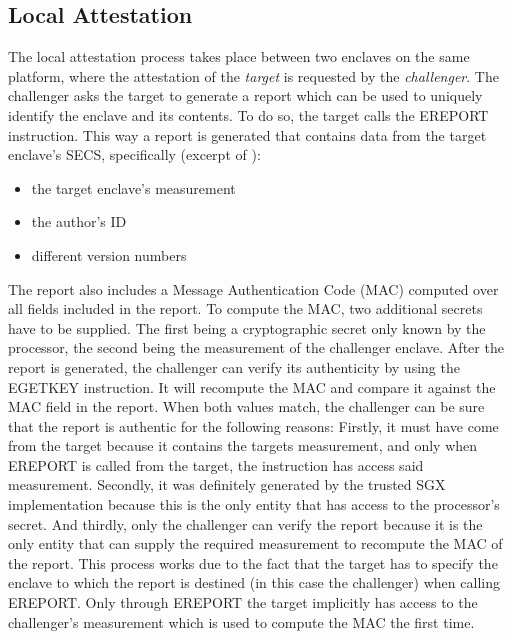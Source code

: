 \subsection{Local Attestation}
The local attestation process takes place between two enclaves on the same platform, where the attestation of the \textit{target} is requested by the \textit{challenger}. The 
challenger asks the target to generate a report which can be used to uniquely identify the enclave and its contents. To do so, the target calls the EREPORT instruction. This way
a report is generated that contains data from the target enclave's SECS, specifically (excerpt of \cite{EnclaveWritersGuide}):
\begin{itemize}
    \item the target enclave's measurement
    \item the author's ID
    \item different version numbers
\end{itemize}
The report also includes a Message Authentication Code (MAC) computed over all fields included in the report. To compute the MAC, two additional secrets have to be supplied.
The first being a cryptographic secret only known by the processor, the second being the measurement of the challenger enclave. After the report is generated, the challenger can
verify its authenticity by using the EGETKEY instruction. It will recompute the MAC and compare it against the MAC field in the report. When both values match, the challenger can
be sure that the report is authentic for the following reasons: Firstly, it must have come from the target because it contains the targets measurement, and only when EREPORT is 
called from the target, the instruction has access said measurement. Secondly, it was definitely generated by the trusted SGX implementation because this is the only entity that 
has access to the processor's secret. And thirdly, only the challenger can verify the report because it is the only entity that can supply the required measurement to recompute the 
MAC of the report. This process works due to the fact that the target has to specify the enclave to which the report is destined (in this case the challenger) when calling EREPORT.
Only through EREPORT the target implicitly has access to the challenger's measurement which is used to compute the MAC the first time.

